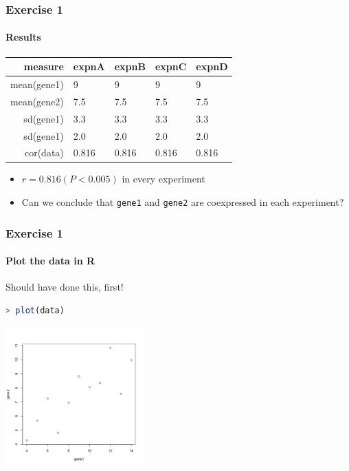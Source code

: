 \documentclass[table]{beamer}
\begin{document}
  \begin{frame}
    \frametitle{Exercise 1}
    \framesubtitle{Results}
    \begin{center}
	\begin{tabular}{r|l|l|l|l}
	  measure & expnA & expnB & expnC & expnD \\
	  \hline
	  mean(gene1) & 9     & 9     & 9     & 9 \\
	  mean(gene2) & 7.5   & 7.5   & 7.5   & 7.5 \\
  	  sd(gene1)   & 3.3   & 3.3   & 3.3   & 3.3 \\
  	  sd(gene1)   & 2.0   & 2.0   & 2.0   & 2.0 \\  
	  cor(data)   & 0.816 & 0.816 & 0.816 & 0.816 \\  
	\end{tabular}
	\end{center}
	\begin{itemize}
      \item<2-> $r=0.816 (P<0.005)$ in every experiment
      \item<2-> Can we conclude that \texttt{gene1} and \texttt{gene2} are coexpressed in each experiment?
    \end{itemize}
  \end{frame}

  \begin{frame}[fragile]
    \frametitle{Exercise 1}
    \framesubtitle{Plot the data in R}
    Should have done this, first! \\
    \begin{lstlisting}[language=R]
> plot(data)
    \end{lstlisting}
    \begin{center}
      \includegraphics[width=0.4\textwidth]{images/ex1_screenshot_d}        
    \end{center}
\end{frame}
\end{document}
